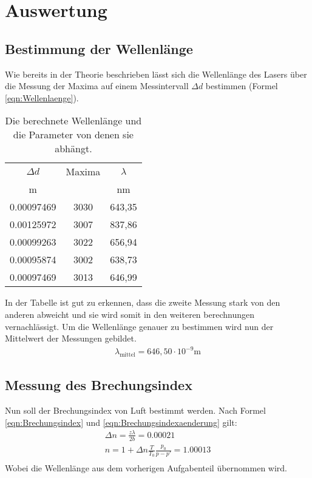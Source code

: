 \section{Auswertung}
\label{sec:Auswertung}
\subsection{Bestimmung der Wellenlänge}
Wie bereits in der Theorie beschrieben lässt sich die Wellenlänge des Lasers über die Messung der Maxima auf einem Messintervall $\Delta d$ bestimmen (Formel \ref{eqn:Wellenlaenge}).
\begin{table}
    \centering
    \begin{tabular}{c c | c }
        \toprule
        $\Delta d $& Maxima & $\lambda$\\
         m &  & nm \\
        \midrule
        0.00097469 & 3030 & 643,35 \\
        0.00125972 & 3007 & 837,86 \\
        0.00099263 & 3022 & 656,94 \\
        0.00095874 & 3002 & 638,73 \\
        0.00097469 & 3013 & 646,99 \\
        \bottomrule
    \end{tabular}
    \caption{Die berechnete Wellenlänge und die Parameter von denen sie abhängt.}
    \label{tab:tab1}
\end{table}
In der Tabelle ist gut zu erkennen, dass die zweite Messung stark von den anderen abweicht und sie wird somit in den weiteren berechnungen vernachlässigt.
Um die Wellenlänge genauer zu bestimmen wird nun der Mittelwert der Messungen gebildet.
\begin{align}
    \lambda_{\text{mittel}} = 646,50 \cdot 10^{-9} \text{m} \nonumber
\end{align}
\subsection{Messung des Brechungsindex}
Nun soll der Brechungsindex von Luft bestimmt werden.
Nach Formel \ref{eqn:Brechungsindex} und \ref{eqn:Brechungsindexaenderung} gilt:
\begin{align}
    \Delta n = \frac{z \lambda}{2 b} = 0.00021 \nonumber \\
    n = 1 + \Delta n \frac{T}{T_0} \frac{p_0}{p-p'} = 1.00013 \nonumber \\
\end{align}
Wobei die Wellenlänge aus dem vorherigen Aufgabenteil übernommen wird.

